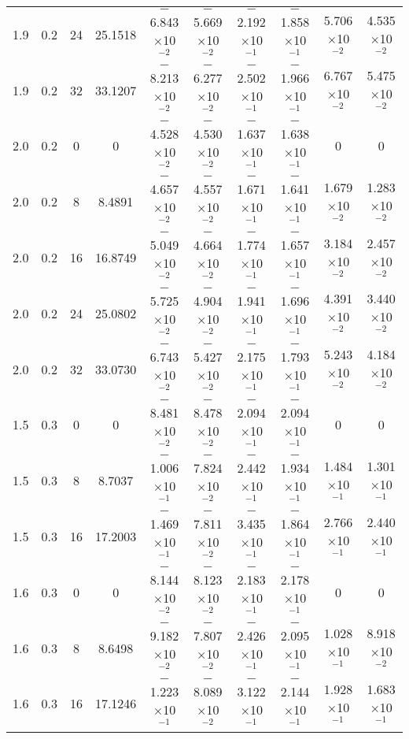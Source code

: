 \documentclass[aps,prd,twocolumn,showpacs,groupedaddress,nofootinbib]{revtex4}
\begin{document}
\begin{widetext}
\begin{table}[h]
\begin{tabular}{|c|c|c|c|c|c|c|c|c|c|}
  1.9&  0.2& 24& 25.1518& $-$6.843$\times$10$^{-2}$& $-$5.669$\times$10$^{-2}$& $-$2.192$\times$10$^{-1}$& $-$1.858$\times$10$^{-1}$&  5.706$\times$10$^{-2}$&    4.535$\times$10$^{-2}$\\
  1.9&  0.2& 32& 33.1207& $-$8.213$\times$10$^{-2}$& $-$6.277$\times$10$^{-2}$& $-$2.502$\times$10$^{-1}$& $-$1.966$\times$10$^{-1}$&  6.767$\times$10$^{-2}$&    5.475$\times$10$^{-2}$\\
  2.0&  0.2&  0&  0& $-$4.528$\times$10$^{-2}$& $-$4.530$\times$10$^{-2}$& $-$1.637$\times$10$^{-1}$& $-$1.638$\times$10$^{-1}$&  0&    0\\
  2.0&  0.2&  8&  8.4891& $-$4.657$\times$10$^{-2}$& $-$4.557$\times$10$^{-2}$& $-$1.671$\times$10$^{-1}$& $-$1.641$\times$10$^{-1}$&  1.679$\times$10$^{-2}$&    1.283$\times$10$^{-2}$\\
  2.0&  0.2& 16& 16.8749& $-$5.049$\times$10$^{-2}$& $-$4.664$\times$10$^{-2}$& $-$1.774$\times$10$^{-1}$& $-$1.657$\times$10$^{-1}$&  3.184$\times$10$^{-2}$&    2.457$\times$10$^{-2}$\\
  2.0&  0.2& 24& 25.0802& $-$5.725$\times$10$^{-2}$& $-$4.904$\times$10$^{-2}$& $-$1.941$\times$10$^{-1}$& $-$1.696$\times$10$^{-1}$&  4.391$\times$10$^{-2}$&    3.440$\times$10$^{-2}$\\
  2.0&  0.2& 32& 33.0730& $-$6.743$\times$10$^{-2}$& $-$5.427$\times$10$^{-2}$& $-$2.175$\times$10$^{-1}$& $-$1.793$\times$10$^{-1}$&  5.243$\times$10$^{-2}$&    4.184$\times$10$^{-2}$\\
\hline
 1.5&  0.3&  0&  0& $-$8.481$\times$10$^{-2}$& $-$8.478$\times$10$^{-2}$& $-$2.094$\times$10$^{-1}$& $-$2.094$\times$10$^{-1}$&  0&    0\\
  1.5&  0.3&  8&  8.7037& $-$1.006$\times$10$^{-1}$& $-$7.824$\times$10$^{-2}$& $-$2.442$\times$10$^{-1}$& $-$1.934$\times$10$^{-1}$&  1.484$\times$10$^{-1}$&    1.301$\times$10$^{-1}$\\
  1.5&  0.3& 16& 17.2003& $-$1.469$\times$10$^{-1}$& $-$7.811$\times$10$^{-2}$& $-$3.435$\times$10$^{-1}$& $-$1.864$\times$10$^{-1}$&  2.766$\times$10$^{-1}$&    2.440$\times$10$^{-1}$\\
  1.6&  0.3&  0&  0& $-$8.144$\times$10$^{-2}$& $-$8.123$\times$10$^{-2}$& $-$2.183$\times$10$^{-1}$& $-$2.178$\times$10$^{-1}$&  0&    0\\
  1.6&  0.3&  8&  8.6498& $-$9.182$\times$10$^{-2}$& $-$7.807$\times$10$^{-2}$& $-$2.426$\times$10$^{-1}$& $-$2.095$\times$10$^{-1}$&  1.028$\times$10$^{-1}$&    8.918$\times$10$^{-2}$\\
  1.6&  0.3& 16& 17.1246& $-$1.223$\times$10$^{-1}$& $-$8.089$\times$10$^{-2}$& $-$3.122$\times$10$^{-1}$& $-$2.144$\times$10$^{-1}$&  1.928$\times$10$^{-1}$&    1.683$\times$10$^{-1}$\\

\end{tabular}
\end{table}
\end{widetext}
\end{document}
